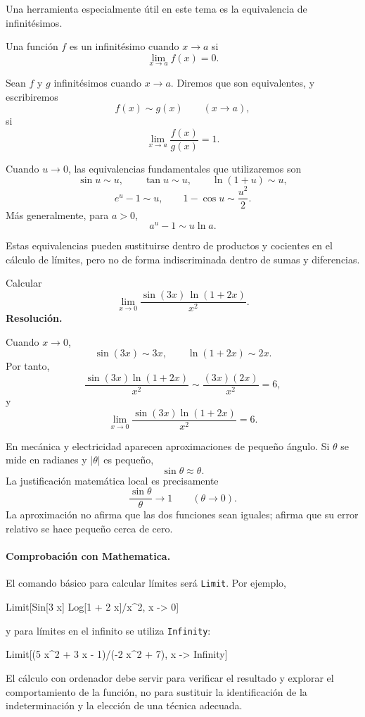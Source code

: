 Una herramienta especialmente útil en este tema es la equivalencia de infinitésimos.

\begin{definition}[Infinitésimo]
Una función $f$ es un infinitésimo cuando $x\to a$ si
\[
\lim_{x\to a}f(x)=0.
\]
\end{definition}

\begin{definition}
Sean $f$ y $g$ infinitésimos cuando $x\to a$. Diremos que son equivalentes, y escribiremos
\[
f(x)\sim g(x)\qquad(x\to a),
\]
si
\[
\lim_{x\to a}\frac{f(x)}{g(x)}=1.
\]
\end{definition}

Cuando $u\to0$, las equivalencias fundamentales que utilizaremos son
\[
\sin u\sim u,
\qquad
\tan u\sim u,
\qquad
\ln(1+u)\sim u,
\]
\[
e^u-1\sim u,
\qquad
1-\cos u\sim\frac{u^2}{2}.
\]
Más generalmente, para $a>0$,
\[
a^u-1\sim u\ln a.
\]

Estas equivalencias pueden sustituirse dentro de productos y cocientes en el cálculo de límites, pero no de forma indiscriminada dentro de sumas y diferencias.

\begin{solvedexercise}
Calcular
\[
\lim_{x\to0}\frac{\sin(3x)\,\ln(1+2x)}{x^2}.
\]
\tcblower
\textbf{Resolución.}\par\smallskip
Cuando $x\to0$,
\[
\sin(3x)\sim3x,
\qquad
\ln(1+2x)\sim2x.
\]
Por tanto,
\[
\frac{\sin(3x)\ln(1+2x)}{x^2}
\sim
\frac{(3x)(2x)}{x^2}=6,
\]
y
\[
\boxed{\displaystyle
\lim_{x\to0}\frac{\sin(3x)\ln(1+2x)}{x^2}=6.}
\]
\end{solvedexercise}

\begin{example}
En mecánica y electricidad aparecen aproximaciones de pequeño ángulo. Si $\theta$ se mide en radianes y $|\theta|$ es pequeño,
\[
\sin\theta\approx\theta.
\]
La justificación matemática local es precisamente
\[
\frac{\sin\theta}{\theta}\longrightarrow1
\qquad(\theta\to0).
\]
La aproximación no afirma que las dos funciones sean iguales; afirma que su error relativo se hace pequeño cerca de cero.
\end{example}

\paragraph{Comprobación con Mathematica.}
El comando básico para calcular límites será \texttt{Limit}. Por ejemplo,
\begin{mathematicacode}
Limit[Sin[3 x] Log[1 + 2 x]/x^2, x -> 0]
\end{mathematicacode}
y para límites en el infinito se utiliza \texttt{Infinity}:
\begin{mathematicacode}
Limit[(5 x^2 + 3 x - 1)/(-2 x^2 + 7), x -> Infinity]
\end{mathematicacode}
El cálculo con ordenador debe servir para verificar el resultado y explorar el comportamiento de la función, no para sustituir la identificación de la indeterminación y la elección de una técnica adecuada.

